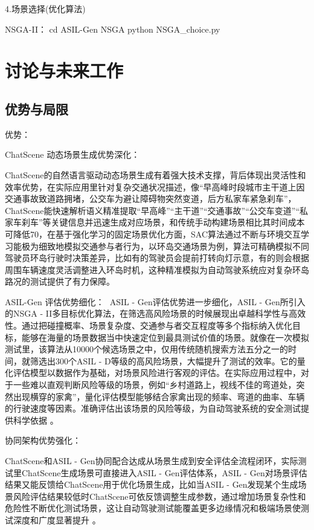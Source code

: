 4.场景选择(优化算法)


NSGA-II：
cd ASIL-Gen NSGA
python NSGA\_choice.py  




\section{讨论与未来工作}
\subsection{优势与局限}

优势：

ChatScene 动态场景生成优势深化​：

ChatScene的自然语言驱动动态场景生成有着强大技术支撑，背后体现出灵活性和效率优势，在实际应用里针对复杂交通状况描述，像“早高峰时段城市主干道上因交通事故致道路拥堵，公交车为避让障碍物突然变道，后方私家车紧急刹车”，ChatScene能快速解析语义精准提取“早高峰”“主干道”“交通事故”“公交车变道”“私家车刹车”等关键信息并迅速生成对应场景，和传统手动构建场景相比其时间成本可降低70，在基于强化学习的固定场景优化方面，SAC算法通过不断与环境交互学习能极为细致地模拟交通参与者行为\cite{ajm2003analysis}，以环岛交通场景为例，算法可精确模拟不同驾驶员环岛行驶时决策差异，比如有的驾驶员会提前打转向灯示意，有的则会根据周围车辆速度灵活调整进入环岛时机，这种精准模拟为自动驾驶系统应对复杂环岛路况的测试提供了有力保障。​


ASIL-Gen 评估优势细化：
​
ASIL - Gen评估优势进一步细化，ASIL - Gen所引入的NSGA - II多目标优化算法，在筛选高风险场景的时候展现出卓越科学性与高效性。通过把碰撞概率、场景复杂度、交通参与者交互程度等多个指标纳入优化目标，能够在海量的场景数据当中快速定位到最具测试价值的场景。就像在一次模拟测试里，该算法从10000个候选场景之中，仅用传统随机搜索方法五分之一的时间，就筛选出300个ASIL - D等级的高风险场景\cite{李霖2014驾驶员在真实交通危险工况中的制动反应时间}，大幅提升了测试的效率。它的量化评估模型以数据作为基础，对场景风险进行客观的评估。在实际应用过程中，对于一些难以直观判断风险等级的场景，例如“乡村道路上，视线不佳的弯道处，突然出现横穿的家禽”，量化评估模型能够结合家禽出现的频率、弯道的曲率、车辆的行驶速度等因素。准确评估出该场景的风险等级，为自动驾驶系统的安全测试提供科学依据 。​


协同架构优势强化​：

ChatScene和ASIL - Gen协同配合达成从场景生成到安全评估全流程闭环，实际测试里ChatScene生成场景可直接进入ASIL - Gen评估体系，ASIL - Gen对场景评估结果又能反馈给ChatScene用于优化场景生成，比如当ASIL - Gen发现某个生成场景风险评估结果较低时ChatScene可依反馈调整生成参数，通过增加场景复杂性和危险性不断优化测试场景，这让自动驾驶测试能覆盖更多边缘情况和极端场景使测试深度和广度显著提升 。


